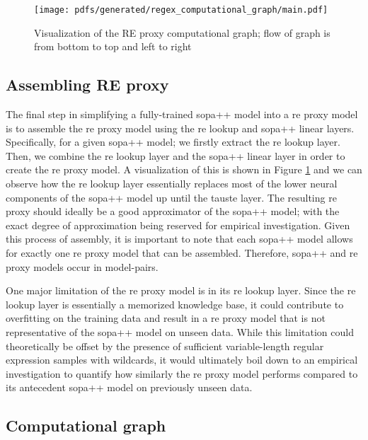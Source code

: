 \begin{figure}[t!]
  \centering
  \texttt{[image: pdfs/generated/regex\_computational\_graph/main.pdf]}
  \caption{Visualization of the RE proxy computational graph; flow of graph is
    from bottom to top and left to right}
  \label{fig:regex_cg}
\end{figure}

\subsection{Assembling RE proxy}

The final step in simplifying a fully-trained \ac{sopa}++ model into a \ac{re} proxy model
is to assemble the \ac{re} proxy model using the \ac{re} lookup and \ac{sopa}++ linear layers.
Specifically, for a given \ac{sopa}++ model; we firstly extract the \ac{re} lookup layer.
Then, we combine the \ac{re} lookup layer and the \ac{sopa}++ linear layer in order to
create the \ac{re} proxy model. A visualization of this is shown in Figure
\ref{fig:regex_cg} and we can observe how the \ac{re} lookup layer essentially
replaces most of the lower neural components of the \ac{sopa}++ model up until the
\ac{tauste} layer. The resulting \ac{re} proxy should ideally be a good approximator of
the \ac{sopa}++ model; with the exact degree of approximation being reserved for
empirical investigation. Given this process of assembly, it is important to note
that each \ac{sopa}++ model allows for exactly one \ac{re} proxy model that can be
assembled. Therefore, \ac{sopa}++ and \ac{re} proxy models occur in model-pairs.

One major limitation of the \ac{re} proxy model is in its \ac{re} lookup layer. Since the
\ac{re} lookup layer is essentially a memorized knowledge base, it could contribute
to overfitting on the training data and result in a \ac{re} proxy model that is not
representative of the \ac{sopa}++ model on unseen data. While this limitation could
theoretically be offset by the presence of sufficient variable-length regular
expression samples with wildcards, it would ultimately boil down to an empirical
investigation to quantify how similarly the \ac{re} proxy model performs compared to
its antecedent \ac{sopa}++ model on previously unseen data.

\subsection{Computational graph}

